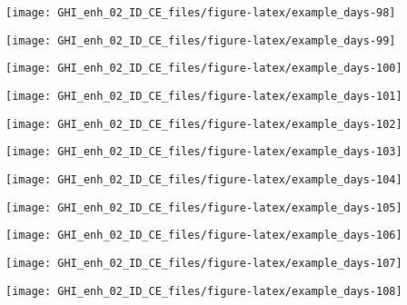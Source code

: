 \documentclass[
  10pt,
  a4paper,oneside]{article}
\begin{document}
\begin{center}\texttt{[image: GHI\_enh\_02\_ID\_CE\_files/figure-latex/example\_days-98]} \end{center}

\begin{center}\texttt{[image: GHI\_enh\_02\_ID\_CE\_files/figure-latex/example\_days-99]} \end{center}

\begin{center}\texttt{[image: GHI\_enh\_02\_ID\_CE\_files/figure-latex/example\_days-100]} \end{center}

\begin{center}\texttt{[image: GHI\_enh\_02\_ID\_CE\_files/figure-latex/example\_days-101]} \end{center}

\begin{center}\texttt{[image: GHI\_enh\_02\_ID\_CE\_files/figure-latex/example\_days-102]} \end{center}

\begin{center}\texttt{[image: GHI\_enh\_02\_ID\_CE\_files/figure-latex/example\_days-103]} \end{center}

\begin{center}\texttt{[image: GHI\_enh\_02\_ID\_CE\_files/figure-latex/example\_days-104]} \end{center}

\begin{center}\texttt{[image: GHI\_enh\_02\_ID\_CE\_files/figure-latex/example\_days-105]} \end{center}

\begin{center}\texttt{[image: GHI\_enh\_02\_ID\_CE\_files/figure-latex/example\_days-106]} \end{center}

\begin{center}\texttt{[image: GHI\_enh\_02\_ID\_CE\_files/figure-latex/example\_days-107]} \end{center}

\begin{center}\texttt{[image: GHI\_enh\_02\_ID\_CE\_files/figure-latex/example\_days-108]} \end{center}
\end{document}
